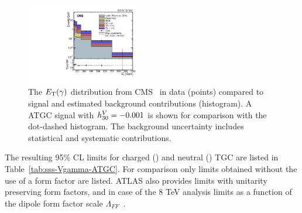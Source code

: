 % 
\begin{figure}[htbp]
  \begin{center}
  \includegraphics[width=0.45\textwidth]{figures/sss-inclboson-diboson-Vgamma-zgamvvgamptgam.pdf}
  \caption{ 
  The $E_{\mathrm{T}}(\gamma)$ distribution from CMS~\cite{Khachatryan:2016yro} in data (points) compared to signal and estimated background contributions (histogram). A ATGC signal with $h_{30}^V=-0.001$ is 
  shown for comparison with the dot-dashed histogram. The background uncertainty includes statistical and systematic contributions. 
}
\label{fig:sss-inclboson-diboson-Vgamma-zgamvvgamptgam}
\end{center}
\end{figure}

The resulting 95\% CL limits for charged (\Wg) and neutral (\Zg) TGC are listed in Table~\ref{tab:sss-Vgamma-ATGC}. For comparison only limits obtained without the use of a form factor are listed. ATLAS
also provides limits with unitarity preserving form factors, and in case of the 8 TeV analysis limits as a function of the dipole form factor scale $\Lambda_{FF}$~\cite{Aad:2016sau}. 

